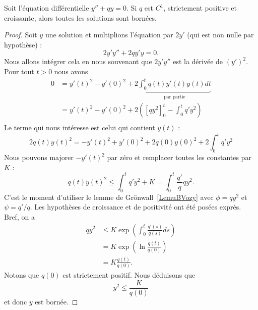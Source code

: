 \begin{proposition} \label{PropMYskGa}
	Soit l'équation différentielle \( y''+qy=0\). Si \( q\) est \( C^1\), strictement positive et croissante, alors toutes les solutions sont bornées.
\end{proposition}

\begin{proof}
	Soit \( y\) une solution et multiplions l'équation par \( 2y'\) (qui est non nulle par hypothèse) :
	\begin{equation}
		2y'y''+2qy'y=0.
	\end{equation}
	Nous allons intégrer cela en nous souvenant que \( 2y'y''\) est la dérivée de \( (y')^2\). Pour tout \( t>0\) nous avons
	\begin{subequations}
		\begin{align}
			0 & =y'(t)^2-y'(0)^2+2\underbrace{\int_0^tq(t)y'(t)y(t)dt}_{\text{par partie}} \\
			  & =y'(t)^2-y'(0)^2+2\left( [qy^2]_0^t-\int_0^tq'y^2 \right)                  \\
		\end{align}
	\end{subequations}
	Le terme qui nous intéresse est celui qui contient \( y(t)\) :
	\begin{equation}
		2q(t)y(t)^2=-y'(t)^2+y'(0)^2+2q(0)y(0)^2+2\int_0^t q'y^2
	\end{equation}
	Nous pouvons majorer \( -y'(t)^2\) par zéro et remplacer toutes les constantes par \( K\) :
	\begin{equation}
		q(t)y(t)^2\leq\int_0^tq'y^2+K=\int_0^t\frac{ q' }{ q }qy^2.
	\end{equation}
	C'est le moment d'utiliser le lemme de Grönwall~\ref{LemuBVozy} avec \( \phi=qy^2\) et \( \psi=q'/q\). Les hypothèses de croissance et de positivité ont été posées exprès. Bref, on a
	\begin{subequations}
		\begin{align}
			qy^2 & \leq K\exp\left( \int_0^t\frac{ q'(s) }{ q(s) }ds \right) \\
			     & =K\exp\left( \ln\frac{ q(t) }{ q(0) } \right)             \\
			     & =K\frac{ q(t) }{ q(0) }.
		\end{align}
	\end{subequations}
	Notons que \( q(0)\) est strictement positif. Nous déduisons que
	\begin{equation}
		y^2\leq \frac{ K }{ q(0) }
	\end{equation}
	et donc \( y\) est bornée.
\end{proof}

